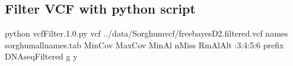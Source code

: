 \documentclass[letterpaper,10pt,english]{sphinxhowto}
\begin{document}
\subsection{Filter VCF with python script}
\label{\detokenize{VCFHunter:filter-vcf-with-python-script}}
\begin{sphinxVerbatim}[commandchars=\\\{\}]
python vcfFilter.1.0.py \PYGZhy{}\PYGZhy{}vcf ../data/Sorghumvcf/freebayes\PYGZus{}D2.filtered.vcf \PYGZhy{}\PYGZhy{}names sorghum\PYGZus{}all\PYGZus{}names.tab
\PYGZhy{}\PYGZhy{}MinCov  \PYGZhy{}\PYGZhy{}MaxCov  \PYGZhy{}\PYGZhy{}MinAl  \PYGZhy{}\PYGZhy{}nMiss  \PYGZhy{}\PYGZhy{}RmAlAlt :3:4:5:6 \PYGZhy{}\PYGZhy{}prefix DNAseq\PYGZus{}Filtered \PYGZhy{}g y
\end{sphinxVerbatim}
\end{document}

